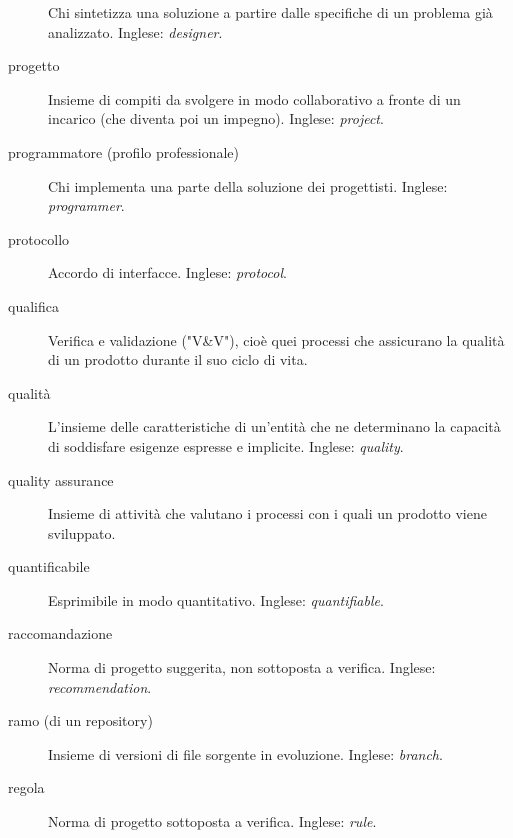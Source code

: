 \documentclass[a4paper]{article}
\begin{document}
\begin{description}
			Chi sintetizza una soluzione a partire dalle specifiche di un problema già analizzato. Inglese: \emph{designer}.
			
	\item[progetto] 

			Insieme di compiti da svolgere in modo collaborativo a fronte di un incarico (che diventa poi un impegno). Inglese: \emph{project}.
			
	\item[programmatore (profilo professionale)] 

			Chi implementa una parte della soluzione dei progettisti. Inglese: \emph{programmer}.
			
	\item[protocollo] 

			Accordo di interfacce. Inglese: \emph{protocol}.
			
	\item[qualifica] 

			Verifica e validazione ("V\&{}V"), cioè quei processi che assicurano la qualità di un prodotto durante il suo ciclo di vita.
			
	\item[qualità] 

			L'insieme delle caratteristiche di un'entità che ne determinano la capacità di soddisfare esigenze espresse e implicite. Inglese: \emph{quality}.
			
	\item[quality assurance] 

			Insieme di attività che valutano i processi con i quali un prodotto viene sviluppato.
			
	\item[quantificabile] 

			Esprimibile in modo quantitativo. Inglese: \emph{quantifiable}.
			
	\item[raccomandazione] 

			Norma di progetto suggerita, non sottoposta a verifica. Inglese: \emph{recommendation}.
			
	\item[ramo (di un repository)] 

			Insieme di versioni di file sorgente in evoluzione. Inglese: \emph{branch}.
			
	\item[regola] 

			Norma di progetto sottoposta a verifica. Inglese: \emph{rule}.
			

\end{description}
\end{document}
